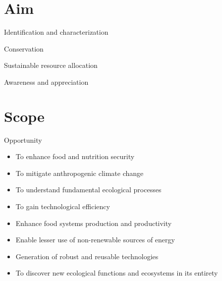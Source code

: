 \documentclass[ignorenonframetext,aspectratio=169]{beamer}
\providecommand{\tightlist}{%
  \setlength{\itemsep}{0pt}\setlength{\parskip}{0pt}}
\begin{document}
\hypertarget{aim}{%
\section{Aim}\label{aim}}

\begin{frame}{Identification and characterization}
\protect\hypertarget{identification-and-characterization}{}

\end{frame}

\begin{frame}{Conservation}
\protect\hypertarget{conservation}{}

\end{frame}

\begin{frame}{Sustainable resource allocation}
\protect\hypertarget{sustainable-resource-allocation}{}

\end{frame}

\begin{frame}{Awareness and appreciation}
\protect\hypertarget{awareness-and-appreciation}{}

\end{frame}

\hypertarget{scope}{%
\section{Scope}\label{scope}}

\begin{frame}{Opportunity}
\protect\hypertarget{opportunity}{}

\begin{itemize}
\tightlist
\item
  To enhance food and nutrition security
\item
  To mitigate anthropogenic climate change
\item
  To understand fundamental ecological processes
\item
  To gain technological efficiency
\item
  Enhance food systems production and productivity
\item
  Enable lesser use of non-renewable sources of energy
\item
  Generation of robust and reusable technologies
\item
  To discover new ecological functions and ecosystems in its entirety
\end{itemize}

\end{frame}
\end{document}
